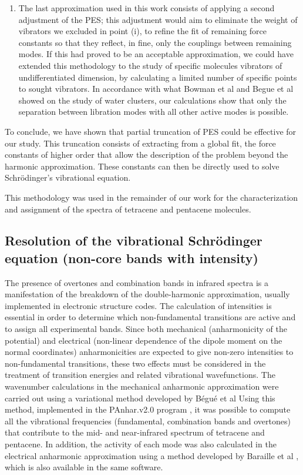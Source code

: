 \begin{enumerate}
	\item The last approximation used in this work consists of applying a second adjustment of the PES; this adjustment would aim to eliminate the weight of vibrators we excluded in point (i), to refine the fit of remaining force constants so that they reflect, in fine, only the couplings between remaining modes. If this had proved to be an acceptable approximation, we could have extended this methodology to the study of specific molecules vibrators of undifferentiated dimension, by calculating a limited number of specific points to sought vibrators. In accordance with what Bowman et al \cite{bowman2008variational} and Begue et al \cite{begue2010calculation}  showed on the study of water clusters, our calculations show that only the separation between libration modes with all other active modes is possible.
	
\end{enumerate}

To conclude, we have shown that partial truncation of PES could be effective for our study. This truncation consists of extracting from a global fit, the force constants of higher order that allow the description of the problem beyond the harmonic approximation. These constants can then be directly used to solve Schr\"{o}dinger's vibrational equation.

This methodology was used in the remainder of our work for the characterization and assignment of the spectra of tetracene and pentacene molecules.

\singlespacing
\subsection{Resolution of the vibrational Schrödinger equation (non-core bands with intensity)}


 The presence of overtones and combination bands in infrared spectra is a manifestation of the breakdown of the double-harmonic approximation, usually implemented in electronic structure codes. The calculation of intensities is essential in order to determine which non-fundamental transitions are active and to assign all experimental bands. Since both mechanical (anharmonicity of the potential) and electrical (non-linear dependence of the dipole moment on the normal coordinates) anharmonicities are expected to give non-zero intensities to non-fundamental transitions, these two effects must be considered in the treatment of transition energies and related vibrational wavefunctions. The wavenumber calculations in the mechanical anharmonic approximation were carried out using a variational method developed by Bégué et al \cite{begue2007comparison} Using this method, implemented in the P\textunderscore Anhar.v2.0 program \cite{gohaud2005new},  it was possible to compute all the vibrational frequencies (fundamental, combination bands and overtones) that contribute to the mid- and near-infrared spectrum of tetracene and pentacene. In addition, the activity of each mode was also calculated in the electrical anharmonic approximation using a method developed by Baraille et al \cite{begue2010calculation,baraille2001calculation} , which is also available in the same software.

